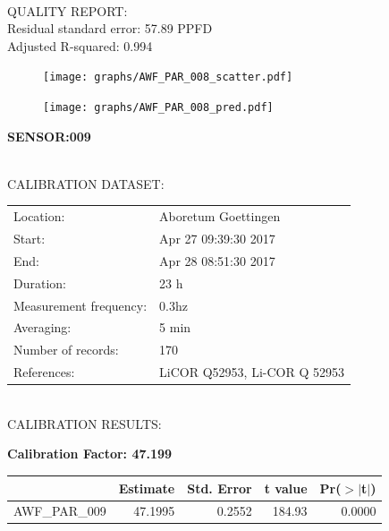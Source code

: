 \documentclass[oneside]{report}
\begin{document}
\hrulefill\\
QUALITY REPORT:\\
Residual standard error: 57.89 PPFD\\
Adjusted R-squared: 0.994



\begin{figure}[H]
  \centering
  \texttt{[image: graphs/AWF\_PAR\_008\_scatter.pdf]}
\end{figure}




\begin{figure}[H]
  \centering
  \texttt{[image: graphs/AWF\_PAR\_008\_pred.pdf]}
\end{figure}

\pagebreak


\begin{center}
\large{\textbf{SENSOR:009}}\\
\end{center}

\hrulefill\\
CALIBRATION DATASET:\\
\begin{table}[h!]
  \centering
  \label{tab:table1}
  \begin{tabular}{ll}
    Location: & Aboretum Goettingen\\ 
    
    
    Start:  & Apr 27 09:39:30 2017 \\
    End:   & Apr 28 08:51:30 2017\\ 
    Duration: & 23 h\\
    Measurement frequency: & 0.3hz\\
    Averaging:  &5 min\\
    Number of records: & 170 \\
    References: & LiCOR Q52953, Li-COR Q 52953 \\
  \end{tabular}
\end{table}

\hrulefill\\
CALIBRATION RESULTS:\\


\begin{center}
\textbf{\large{Calibration Factor: 47.199}}\\
\end{center}
\begin{table}[ht]
\centering
\begin{tabular}{rrrrr}
  \hline
 & Estimate & Std. Error & t value & Pr($>$$|$t$|$) \\ 
  \hline
AWF\_PAR\_009 & 47.1995 & 0.2552 & 184.93 & 0.0000 \\ 
   \hline
\end{tabular}
\end{table}
\end{document}
